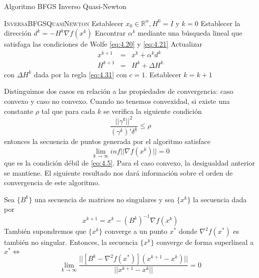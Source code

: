 \begin{algorithm}
\caption{Algoritmo BFGS Inverso Quasi-Newton}\label{alg:BFGSQuasiNewton}
\begin{algorithmic}[1]
\Procedure \textsc{InversaBFGSQuasiNewton}
\State Establecer $x_0\in\mathbb{R}^n, H^0=I$ y $k=0$
	\State Establecer la dirección $d^k = -H^k\nabla f(x^k)$
	\State Encontrar $\alpha^k$ mediante una búsqueda lineal que satisfaga las condiciones de Wolfe \ref{eq:4.20} y \ref{eq:4.21}
	\State Actualizar \begin{equation}
	\begin{matrix}
  x^{k+1} & = & x^k+\alpha^kd^k\\
  H^{k+1} & = & H^k + \Delta H^k
 \end{matrix}
	\end{equation}
	con $\Delta H^k$ dada por la regla \ref{eq:4.31} con $c=1$.
	\State Establecer $k = k+1$
\EndWhile
\EndProcedure
\end{algorithmic}
\end{algorithm}

Distinguimos dos casos en relación a las propiedades de convergencia: caso convexo y caso no convexo. 
Cuando no tenemos convexidad, si existe una constante $\rho$ tal que para cada $k$ se verifica la siguiente condición
\begin{equation}
\dfrac{||\gamma^k||^2}{(\gamma^k)'\delta^k} \leq \rho
\label{eq:4.32}
\end{equation}
entonces la secuencia de puntos generada por el algoritmo satisface
\begin{equation*}
\lim_{k\xrightarrow{}{}\infty} inf||\nabla f(x^k)|| = 0
\end{equation*}
que es la condición débil de \ref{eq:4.5}. 
Para el caso convexo, la desigualdad anterior se mantiene. 
El siguiente resultado nos dará información sobre el orden de convergencia de este algoritmo. 

\begin{proposicion}
Sea $\{B^k\}$ una secuencia de matrices no singulares y sea $\{x^k\}$ la secuencia dada por
\begin{equation*}
x^{k+1} = x^k - (B^k)^{-1}\nabla f(x^k)
\end{equation*}
También supondremos que $\{x^k\}$ converge a un punto $x^*$ donde $\nabla^2 f(x^*)$ es también no singular. 
Entonces, la secuencia $\{x^k\}$ converge de forma superlineal a $x^* \Leftrightarrow$
\begin{equation*}
\lim_{k\xrightarrow{}{}\infty}\dfrac{||[B^k-\nabla^2f(x^*)](x^{k+1}-x^k)||}{||x^{k+1}-x^k||} = 0
\end{equation*}
\end{proposicion}

